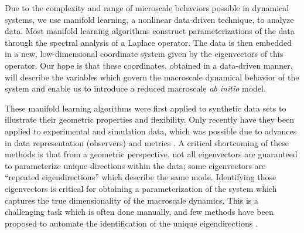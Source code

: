 \documentclass[preprint]{elsarticle}
\begin{document}
%

Due to the complexity and range of microscale behaviors possible in dynamical systems, we use manifold learning, a nonlinear data-driven technique, to analyze data.
%
Most manifold learning algorithms \cite{...} construct parameterizations of the data through the spectral analysis of a Laplace operator.
%
The data is then embedded in a new, low-dimensional coordinate system given by the eigenvectors of this operator. 
%
Our hope is that these coordinates, obtained in a data-driven manner, will describe the variables which govern the macroscale dynamical behavior of the system and enable us to introduce a reduced macroscale {\em ab initio} model. 

These manifold learning algorithms were first applied to synthetic data sets to illustrate their geometric properties and flexibility. 
%
Only recently have they been applied to experimental and simulation data, which was possible due to advances in data representation (observers) and metrics \cite{...}. 
%
A critical shortcoming of these methods is that from a geometric perspective, not all eigenvectors are guaranteed to parameterize unique directions within the data; some eigenvectors are ``repeated eigendirections'' which describe the same mode. 
%
Identifying those eigenvectors is critical for obtaining a parameterization of the system which captures the true dimensionality of the macroscale dynamics.  
%
This is a challenging task which is often done manually, and few methods have been proposed to automate the identification of the unique eigendirections \cite{...}. 
\end{document}
